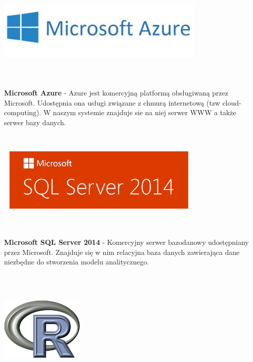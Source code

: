\documentclass[licencjacka]{pracamgr}
\begin{document}
 \begin{minipage}{\linewidth}
            \centering
            \includegraphics[width=10cm, height = 3cm]{Azure.jpg}
\end{minipage} \\ \\
\noindent 
 \textbf{Microsoft Azure} - Azure jest komercyjną platformą obsługiwaną przez Microsoft. Udostępnia ona usługi związane z chmurą internetową (tzw cloud-computing). W naszym systemie znajduje sie na niej serwer WWW a także serwer bazy danych. \par ~\\
\begin{minipage}{\linewidth}
            \centering
            \includegraphics[width=10cm, height = 3cm]{sql-server-2014-logo.png}
\end{minipage} \\ \\

\noindent \textbf{Microsoft SQL Server 2014} - Komercyjny serwer bazodanowy udostępniany przez Microsoft. Znajduje się w nim relacyjna baza danych zawierająca dane niezbędne do stworzenia modelu analitycznego.  \par ~\\

\begin{minipage}{\linewidth}
            \centering
            \includegraphics[width=4cm, height = 4cm]{R.png}
\end{minipage} \\ \\
\end{document}
